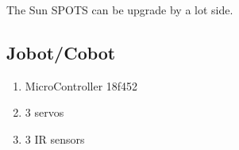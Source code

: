 \documentclass[a4,english]{article}
\begin{document}
The Sun SPOTS can be upgrade by a lot side.

\subsection{Jobot/Cobot}
\label{app:cobot}
\begin{enumerate} 
	\item MicroController 18f452
	\item 3 servos
	\item 3 IR sensors
\end{enumerate}
\end{document}
